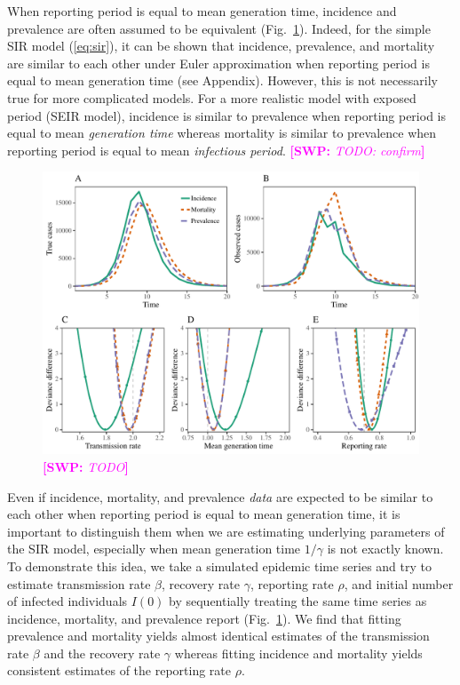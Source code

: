 \documentclass{article}
\newcommand{\eref}[1]{(\ref{eq:#1})}
\newcommand{\fref}[1]{Fig.~\ref{fig:#1}}
\newcommand{\comment}[3]{\textcolor{#1}{\textbf{[#2: }\textsl{#3}\textbf{]}}}
\newcommand{\swp}[1]{\comment{magenta}{SWP}{#1}}
\begin{document}
When reporting period is equal to mean generation time, incidence and prevalence are often assumed to be equivalent (\fref{incidence}).
Indeed, for the simple SIR model \eref{sir}, it can be shown that incidence, prevalence, and mortality are similar to each other under Euler approximation when reporting period is equal to mean generation time (see Appendix).
However, this is not necessarily true for more complicated models. 
For a more realistic model with exposed period (SEIR model), incidence is similar to prevalence when reporting period is equal to mean \emph{generation time} whereas mortality is similar to prevalence when reporting period is equal to mean \emph{infectious period}. \swp{TODO: confirm}


\begin{figure}[t]
\includegraphics[width=\textwidth]{../figure/compare_profile_likelihood.pdf}
\caption{
\swp{TODO}
} 
\label{fig:incidence}
\end{figure}

Even if incidence, mortality, and prevalence \emph{data} are expected to be similar to each other when reporting period is equal to mean generation time, it is important to distinguish them when we are estimating underlying parameters of the SIR model, especially when mean generation time $1/\gamma$ is not exactly known.
To demonstrate this idea, we take a simulated epidemic time series and try to estimate transmission rate $\beta$, recovery rate $\gamma$, reporting rate $\rho$, and initial number of infected individuals $I(0)$ by sequentially treating the same time series as incidence, mortality, and prevalence report (\fref{incidence}).
We find that fitting prevalence and mortality yields almost identical estimates of the transmission rate $\beta$ and the recovery rate $\gamma$ whereas fitting incidence and mortality yields consistent estimates of the reporting rate $\rho$.
\end{document}
